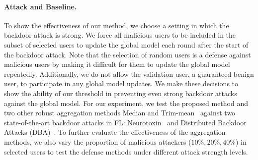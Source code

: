 \documentclass{article} %
\begin{document}
\paragraph{Attack and Baseline.} To show the effectiveness of our method, we choose a setting in which the backdoor attack is strong. We force all malicious users to be included in the subset of selected users to update the global model each round after the start of the backdoor attack. Note that the selection of random users is a defense against malicious users by making it difficult for them to update the global model repeatedly. Additionally, we do not allow the validation user, a guaranteed benign user, to participate in any global model updates. We make these decisions to show the ability of our threshold in preventing even strong backdoor attacks against the global model. 
For our experiment, we test the proposed method and two other robust aggregation methods Median and Trim-mean~\citep{trim-mean} against two state-of-the-art backdoor attacks in FL: Neurotoxin~\citep{neurotoxin} and Distributed Backdoor Attacks (DBA)~\citep{dba}. To further evaluate the effectiveness of the aggregation methods, we also vary the proportion of malicious attackers ($10\%, 20\%, 40\%$) in selected users to test the defense methods under different attack strength levels.



\vspace{-10pt}
\end{document}
